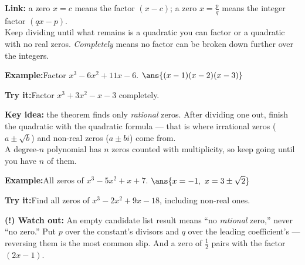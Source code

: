\documentclass[12pt]{article}
\begin{document}
\begin{formulabox}
\textbf{Link:} a zero $x = c$ means the factor $(x - c)$; a zero
$x = \frac{p}{q}$ means the integer factor $(qx - p)$.\\[3pt]
Keep dividing until what remains is a quadratic you can factor or a quadratic
with no real zeros. \emph{Completely} means no factor can be broken down
further over the integers.
\end{formulabox}
\begin{examplebox}
\textbf{Example:}\quad Factor $x^3 - 6x^2 + 11x - 6$.
$\ans{(x-1)(x-2)(x-3)}$
\end{examplebox}
\begin{tryitbox}
\textbf{Try it:}\quad Factor $x^3 + 3x^2 - x - 3$ completely.\\[2pt]
\end{tryitbox}

\begin{formulabox}
\textbf{Key idea:} the theorem finds only \emph{rational} zeros. After dividing
one out, finish the quadratic with the quadratic formula --- that is where
irrational zeros ($a \pm \sqrt{b}$) and non-real zeros ($a \pm bi$) come from.
\\[3pt]
A degree-$n$ polynomial has $n$ zeros counted with multiplicity, so keep going
until you have $n$ of them.
\end{formulabox}
\begin{examplebox}
\textbf{Example:}\quad All zeros of $x^3 - 5x^2 + x + 7$.
$\ans{x = -1,\ x = 3 \pm \sqrt{2}}$
\end{examplebox}
\begin{tryitbox}
\textbf{Try it:}\quad Find all zeros of $x^3 - 2x^2 + 9x - 18$, including
non-real ones.\\[2pt]
\end{tryitbox}

\begin{watchoutbox}
\textbf{(!) Watch out:} An empty candidate list result means ``no \emph{rational}
zero,'' never ``no zero.'' Put $p$ over the constant's divisors and $q$ over the
leading coefficient's --- reversing them is the most common slip. And a zero of
$\frac{1}{2}$ pairs with the factor $(2x-1)$.
\end{watchoutbox}
\end{document}
